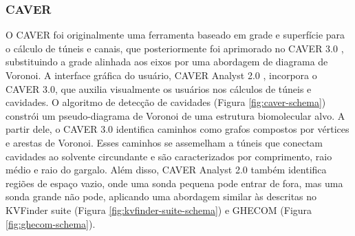 \documentclass[Portugues]{phdquali}
\begin{document}
\subsubsection{CAVER}

O CAVER \cite{caver} foi originalmente uma ferramenta baseado em grade e superfície para o cálculo de túneis e canais, que posteriormente foi aprimorado no CAVER 3.0 \cite{caver3}, substituindo a grade alinhada aos eixos por uma abordagem de diagrama de Voronoi. A interface gráfica do usuário, CAVER Analyst 2.0 \cite{caveranalyst2}, incorpora o CAVER 3.0, que auxilia visualmente os usuários nos cálculos de túneis e cavidades. O algoritmo de detecção de cavidades (Figura \ref{fig:caver-schema}) constrói um pseudo-diagrama de Voronoi de uma estrutura biomolecular alvo. A partir dele, o CAVER 3.0 identifica caminhos como grafos compostos por vértices e arestas de Voronoi. Esses caminhos se assemelham a túneis que conectam cavidades ao solvente circundante e são caracterizados por comprimento, raio médio e raio do gargalo. Além disso, CAVER Analyst 2.0 também identifica regiões de espaço vazio, onde uma sonda pequena pode entrar de fora, mas uma sonda grande não pode, aplicando uma abordagem similar às descritas no KVFinder suite (Figura \ref{fig:kvfinder-suite-schema}) e GHECOM (Figura \ref{fig:ghecom-schema}).
\end{document}
